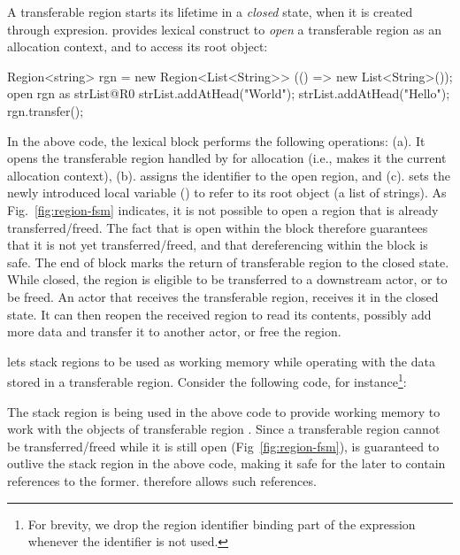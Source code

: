 A transferable region starts its lifetime in a \emph{closed} state,
when it is created through  expresion. \name provides
 lexical construct to \emph{open} a transferable region as an
allocation context, and to access its root object:
\begin{codejava}
  Region<string> rgn = new Region<List<String>>
                        (() => new List<String>());
  open rgn as  strList@R0 {
    strList.addAtHead("World");
    strList.addAtHead("Hello");
  }
  rgn.transfer();
\end{codejava}
In the above code, the  lexical block performs the
following operations: (a). It opens the transferable region handled by
 for allocation (i.e., makes it the current allocation
context), (b). assigns the identifier  to the open region, and
(c). sets the newly introduced local variable () to refer
to its root object (a list of strings). As Fig.~\ref{fig:region-fsm}
indicates, it is not possible to open a region that is already
transferred/freed. The fact that  is open within the block
therefore guarantees that it is not yet transferred/freed, and that
dereferencing  within the block is safe. The end of
 block marks the return of transferable region to the closed
state.  While closed, the region is eligible to be transferred to a
downstream actor, or to be freed.  An actor that receives the
transferable region, receives it in the closed state. It can then
reopen the received region to read its contents, possibly add more
data and transfer it to another actor, or free the region. 

\name lets stack regions to be used as working memory while operating
with the data stored in a transferable region. Consider the following
code, for instance\footnote{For brevity, we drop the region identifier binding part of the
 expression whenever the identifier is not used.}:
\begin{codejava}
void onReceive(Region<List<String>> rgn)
  open rgn as strList {
    letregion R1 {
      String s = "";
      ListIterator<String> i = strList.listIterator();
      while(i.hasNext()) {
        s += i.getNext();
      }
      print s; //prints "HelloWorld"
    }
  }
  rgn.free();
}
\end{codejava}
The stack region  is being used in the above code to provide
working memory to work with the objects of transferable region
. Since a transferable region cannot be transferred/freed while
it is still open (Fig~\ref{fig:region-fsm}),  is guaranteed to
outlive the stack region  in the above code, making it safe for
the later to contain references to the former. \name therefore allows
such references.

